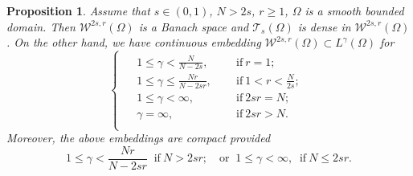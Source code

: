 \documentclass[10pt]{article}
\numberwithin{equation}{section}
\newtheorem{proposition}[theorem]{Proposition}
\numberwithin{equation}{section}
\begin{document}
\begin{proposition}\label{2302102144}
Assume that $s\in (0,1)$, $N>2s$, $r\ge 1$, $\Omega$ is a smooth bounded domain. Then $\mathcal{W}^{2s, r}(\Omega)$ is a Banach space and $\mathcal{T}_s(\Omega)$ is dense in $\mathcal{W}^{2s, r}(\Omega)$. On the other hand, we have continuous embedding $\mathcal{W}^{2s, r}(\Omega)\subset L^{\gamma}(\Omega)$ for
\begin{equation}\label{2302110107}
\begin{cases}
\begin{aligned}
&1\le \gamma<\frac{N}{N-2s}, \;\; &&\text{if}~ r=1;\\
&1\le \gamma\le\frac{Nr}{N-2sr}, \;\; &&\text{if}~1 < r < \frac{N}{2s};\\
&1\le \gamma<\infty,  && \text{if}~2sr = N;\\
& \gamma = \infty,  && \text{if}~ 2sr > N.\\
\end{aligned}
\end{cases}
\end{equation}
Moreover, the above embeddings are compact provided
\begin{equation}\label{2302110109}
1\le \gamma<\frac{Nr}{N-2sr}\;\;  \text{if}~N>2sr;\quad \mbox{or} \;\; 1\le \gamma<\infty, \;\; \text{if}~N\le 2sr.
\end{equation}
\end{proposition}
\end{document}
